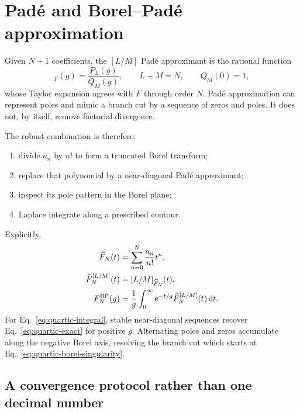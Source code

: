 \section{Pad\'e and Borel--Pad\'e approximation}
\label{sec:pade-borel-pade}

Given $N+1$ coefficients, the $[L/M]$ Pad\'e approximant is the rational
function
\begin{equation}
  [L/M]_F(g)=\frac{P_L(g)}{Q_M(g)},
  \qquad L+M=N,
  \qquad Q_M(0)=1,
  \label{eq:pade-definition}
\end{equation}
whose Taylor expansion agrees with $F$ through order $N$.  Pad\'e
approximation can represent poles and mimic a branch cut by a sequence of
zeros and poles.  It does not, by itself, remove factorial divergence.

The robust combination is therefore:
\begin{enumerate}[label=\arabic*.]
  \item divide $a_n$ by $n!$ to form a truncated Borel transform;
  \item replace that polynomial by a near-diagonal Pad\'e approximant;
  \item inspect its pole pattern in the Borel plane;
  \item Laplace integrate along a prescribed contour.
\end{enumerate}
Explicitly,
\begin{align}
  \widehat F_N(t)
  &=\sum_{n=0}^{N}\frac{a_n}{n!}t^n,
  \\
  \widehat F_N^{[L/M]}(t)
  &= [L/M]_{\widehat F_N}(t),
  \\
  F_N^{\mathrm{BP}}(g)
  &=\frac{1}{g}\int_0^\infty
    \mathrm{e}^{-t/g}\widehat F_N^{[L/M]}(t)\,\mathrm{d} t.
  \label{eq:borel-pade-algorithm}
\end{align}
For Eq.~\eqref{eq:quartic-integral}, stable near-diagonal sequences recover
Eq.~\eqref{eq:quartic-exact} for positive $g$.  Alternating poles and zeros
accumulate along the negative Borel axis, resolving the branch cut which
starts at Eq.~\eqref{eq:quartic-borel-singularity}.

\subsection{A convergence protocol rather than one decimal number}
\label{subsec:resummation-protocol}

